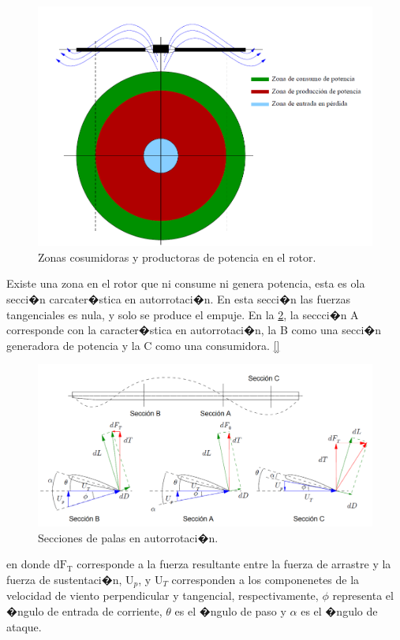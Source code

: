 \documentclass[10pt,a4paper]{book}
\begin{document}
\begin{figure}[H]
	\centering
		\includegraphics[scale=0.35]{Imagenes/Potencia.png}
	\caption{Zonas cosumidoras y productoras de potencia en el rotor.}
	\label{img:Potencia}
\end{figure}

Existe una zona en el rotor que ni consume ni genera potencia, esta es ola secci�n carcater�stica en autorrotaci�n. En esta secci�n las fuerzas tangenciales es nula, y solo se produce el empuje. En la \ref{img:Secciones}, la seccci�n A corresponde con la caracter�stica en autorrotaci�n, la B como una secci�n generadora de potencia y la C como una consumidora. \ref{}
   
\begin{figure}[H]
	\centering
		\includegraphics[scale=0.35]{Imagenes/Secciones.png}
	\caption{Secciones de palas en autorrotaci�n.}
	\label{img:Secciones}
\end{figure}

en donde $\text{dF}_{\text{T}}$ corresponde a la fuerza resultante entre la fuerza de arrastre y la fuerza de sustentaci�n, $\text{U}_{p}$, y $\text{U}_{T}$ corresponden a los componenetes de la velocidad de viento perpendicular y tangencial, respectivamente, $\phi$ representa el �ngulo de entrada de corriente, $\theta$ es el �ngulo de paso y  $\alpha$ es el �ngulo de ataque.
\end{document}
